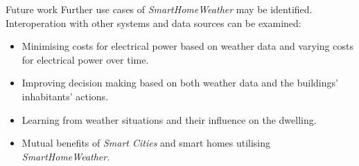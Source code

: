 \documentclass[final,hyperref={pdfpagelabels=true}]{beamer}
\begin{document}
\begin{frame}[fragile]
\begin{columns}[t]
\begin{column}{.45\textwidth}
      \begin{block}{Future work}
	Further use cases of \emph{SmartHomeWeather} may be identified. Interoperation with other systems and data sources can be examined:
          \begin{itemize}
            \item Minimising costs for electrical power based on weather data and varying costs for electrical power over time.
	    \item Improving decision making based on both weather data and the buildings' inhabitants' actions.
	    \item Learning from weather situations and their influence on the dwelling.
	    \item Mutual benefits of \emph{Smart Cities} and smart homes utilising \emph{SmartHomeWeather}.
	  \end{itemize}

	  \vspace{4.2mm}
      \end{block}

%	
%	
    \end{column}
  \end{columns}

  
\end{frame}
\end{document}
